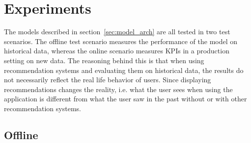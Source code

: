 \chapter{Experiments}
The models described in section~\ref{sec:model_arch} are all tested in two test scenarios.
The offline test scenario measures the performance of the model on historical data, whereas the online scenario measures KPIs in a production setting on new data.
The reasoning behind this is that when using recommendation systems and evaluating them on historical data, the results do not necessarily reflect the real life behavior of users.
Since displaying recommendations changes the reality, i.e. what the user sees when using the application is different from what the user saw in the past without or with other recommendation systems.
\section{Offline}
